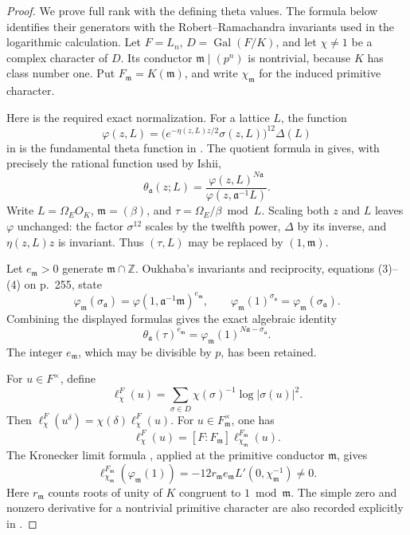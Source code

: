 \documentclass[11pt]{article}
\theoremstyle{definition}\newtheorem{definition}[theorem]{Definition}
\begin{document}
\begin{proof}
We prove full rank with the defining theta values.
The formula below identifies their generators with the
Robert--Ramachandra invariants used in the logarithmic calculation.
Let \(F=L_n\), \(D=\operatorname{Gal}(F/K)\), and let
\(\chi\ne1\) be a complex character of \(D\).
Its conductor \(\mathfrak m\mid(p^n)\) is nontrivial, because
\(K\) has class number one.
Put \(F_{\mathfrak m}=K(\mathfrak m)\), and write
\(\chi_{\mathfrak m}\) for the induced primitive character.

Here is the required exact normalization.
For a lattice \(L\), the function
\[
 \varphi(z,L)=
       \bigl(e^{-\eta(z,L)z/2}\sigma(z,L)\bigr)^{12}\Delta(L)
\]
in \cite[(2), p.~255]{Oukhaba2009} is the fundamental theta
function in \cite[Definition 3.1(i), p.~6]{GotoIshii2026}.
The quotient formula in
\cite[Definition 3.1(ii), equation (1), p.~6]{GotoIshii2026}
gives, with precisely the rational function used by Ishii,
\[
 \theta_{\mathfrak a}(z;L)=
              \frac{\varphi(z,L)^{N\mathfrak a}}
                   {\varphi(z,\mathfrak a^{-1}L)}.
\]
Write \(L=\Omega_E O_K\), \(\mathfrak m=(\beta)\), and
\(\tau=\Omega_E/\beta\bmod L\).
Scaling both \(z\) and \(L\) leaves \(\varphi\) unchanged:
the factor \(\sigma^{12}\) scales by the twelfth power,
\(\Delta\) by its inverse, and \(\eta(z,L)z\) is invariant.
Thus \((\tau,L)\) may be replaced by \((1,\mathfrak m)\).

Let \(e_{\mathfrak m}>0\) generate
\(\mathfrak m\cap\mathbb Z\).
Oukhaba's invariants and reciprocity, equations (3)--(4) on
p.~255, state
\[
 \varphi_{\mathfrak m}(\sigma_{\mathfrak a})
      =\varphi(1,\mathfrak a^{-1}\mathfrak m)^{e_{\mathfrak m}},
 \qquad
 \varphi_{\mathfrak m}(1)^{\sigma_{\mathfrak a}}
      =\varphi_{\mathfrak m}(\sigma_{\mathfrak a}).
\]
Combining the displayed formulas gives the exact algebraic identity
\begin{equation}\label{eq:cm-exact-unit-convention}
 \theta_{\mathfrak a}(\tau)^{e_{\mathfrak m}}
       =\varphi_{\mathfrak m}(1)^{
                                  N\mathfrak a-\sigma_{\mathfrak a}}.
\end{equation}
The integer \(e_{\mathfrak m}\), which may be divisible by \(p\),
has been retained.

For \(u\in F^\times\), define
\[
 \ell_\chi^F(u)=
       \sum_{\sigma\in D}\chi(\sigma)^{-1}
                                    \log|\sigma(u)|^2.
\]
Then
\(\ell_\chi^F(u^\delta)=\chi(\delta)\ell_\chi^F(u)\).
For \(u\in F_{\mathfrak m}^\times\), one has
\[
 \ell_\chi^F(u)=[F:F_{\mathfrak m}]
                       \ell_{\chi_{\mathfrak m}}^{F_{\mathfrak m}}(u).
\]
The Kronecker limit formula
\cite[(6), p.~256]{Oukhaba2009}, applied at the primitive
conductor \(\mathfrak m\), gives
\[
 \ell_{\chi_{\mathfrak m}}^{F_{\mathfrak m}}
                         (\varphi_{\mathfrak m}(1))
   =-12r_{\mathfrak m}e_{\mathfrak m}
                          L'(0,\chi_{\mathfrak m}^{-1})\ne0 .
\]
Here \(r_{\mathfrak m}\) counts roots of unity of \(K\)
congruent to \(1\bmod\mathfrak m\).
The simple zero and nonzero derivative for a nontrivial primitive
character are also recorded explicitly in
\cite[\S2.3, p.~6, before (2.3)--(2.4)]{Oukhaba2003}.


\end{proof}
\end{document}
